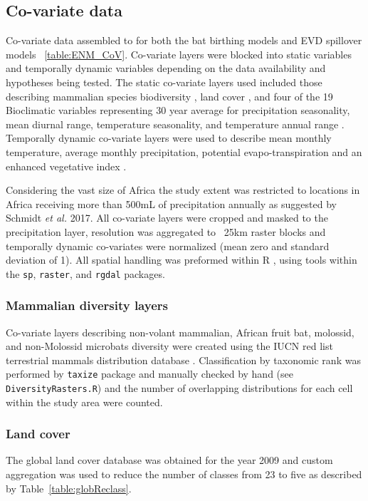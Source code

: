 \documentclass[9pt,twoside,lineno]{pnas-new}
\begin{document}
\subsection*{Co-variate data}
\label{CoV}
Co-variate data assembled to for both the bat birthing models and EVD spillover models ~\ref{table:ENM_CoV}. Co-variate layers were blocked into static variables and temporally dynamic variables depending on the data availability and hypotheses being tested. The static co-variate layers used included those describing mammalian species biodiversity \cite{IUCN2016TerrestrialData}, land cover \cite{Olivier2012Global2009}, and four of the 19 Bioclimatic variables representing 30 year average for precipitation seasonality, mean diurnal range, temperature seasonality, and temperature annual range \cite{Frick2017WorldclimArease}. Temporally dynamic co-variate layers were used to describe mean monthly temperature, average monthly precipitation, potential evapo-transpiration \cite{Trabucco2009GlobalDatabase} and an enhanced vegetative index \cite{Huete2002OverviewIndices}.\par
Considering the vast size of Africa the study extent was restricted to locations in Africa receiving more than 500mL of precipitation annually as suggested by Schmidt \textit{et al.} 2017\cite{Schmidt2017SpatiotemporalSpillover}. All co-variate layers were cropped and  masked to the precipitation layer, resolution was aggregated to ~25km raster blocks and temporally dynamic co-variates were normalized (mean zero and standard deviation of 1). All spatial handling was preformed within R \cite{Team2017R:Computing}, using tools within the \texttt{sp}, \texttt{raster}, and \texttt{rgdal} packages.\par
\subsubsection*{Mammalian diversity layers}
Co-variate layers describing non-volant mammalian, African fruit bat, molossid, and non-Molossid microbats diversity were created using the IUCN red list terrestrial mammals distribution database \cite{IUCN2016TerrestrialData}. Classification by taxonomic rank was performed by \texttt{taxize} package \cite{Chamberlain2013Taxize:R} and manually checked by hand (see \texttt{DiversityRasters.R}) and the number of overlapping distributions for each cell within the study area were counted.\par
\subsubsection*{Land cover}
The global land cover database \cite{Olivier2012Global2009} was obtained for the year 2009 and custom aggregation was used to reduce the number of classes from 23 to five as described by Table~\ref{table:globReclass}.\par
\end{document}
